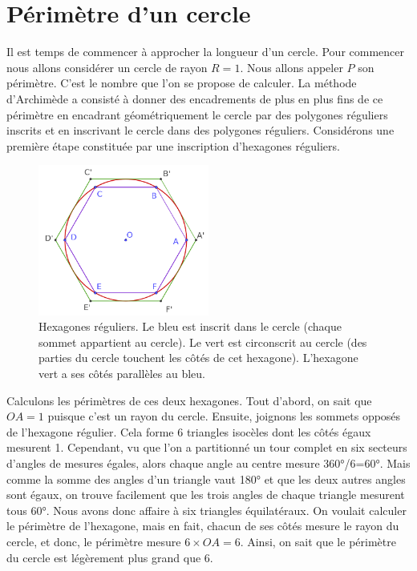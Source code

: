 \section{Périmètre d'un cercle}

	Il est temps de commencer à approcher la longueur d'un cercle. Pour commencer nous allons considérer un cercle de rayon $R=1$. Nous allons appeler $P$ son périmètre. C'est le nombre que l'on se propose de calculer. La méthode d'Archimède a consisté à donner des encadrements de plus en plus fins de ce périmètre en encadrant géométriquement le cercle par des polygones réguliers inscrits et en inscrivant le cercle dans des polygones réguliers. Considérons une première étape constituée par une inscription d'hexagones réguliers.
	\begin{figure}
		\includegraphics[width=0.5\textwidth]{image/pi_nombre/poly_inscrit.png}
		\caption{Hexagones réguliers. Le bleu est inscrit dans le cercle (chaque sommet appartient au cercle). Le vert est circonscrit au cercle (des parties du cercle touchent les côtés de cet hexagone). L'hexagone vert a ses côtés parallèles au bleu.}
	\end{figure}

	Calculons les périmètres de ces deux hexagones. Tout d'abord, on sait que $OA=1$ puisque c'est un rayon du cercle. Ensuite, joignons les sommets opposés de l'hexagone régulier. Cela forme 6 triangles isocèles dont les côtés égaux mesurent 1. Cependant, vu que l'on a partitionné un tour complet en six secteurs d'angles de mesures égales, alors chaque angle au centre mesure 360°/6=60°. Mais comme la somme des angles d'un triangle vaut 180° et que les deux autres angles sont égaux, on trouve facilement que les trois angles de chaque triangle mesurent tous 60°. Nous avons donc affaire à six triangles équilatéraux. On voulait calculer le périmètre de l'hexagone, mais en fait, chacun de ses côtés mesure le rayon du cercle, et donc, le périmètre mesure $6\times OA=6$. Ainsi, on sait que le périmètre du cercle est légèrement plus grand que 6.

